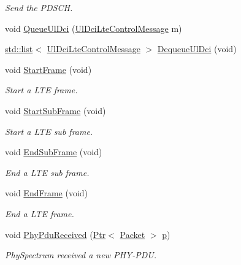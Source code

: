 \begin{DoxyCompactItemize}
\begin{DoxyCompactList}\small\item\em Send the P\+D\+S\+CH. \end{DoxyCompactList}\item 
void \hyperlink{classns3_1_1LteEnbPhy_a95bdedc1bcc58b79f4d1e26080cdf3f2}{Queue\+Ul\+Dci} (\hyperlink{classns3_1_1UlDciLteControlMessage}{Ul\+Dci\+Lte\+Control\+Message} m)
\item 
\hyperlink{openflow-interface_8h_afd9bcfa176617760671b67580f536fa7}{std\+::list}$<$ \hyperlink{classns3_1_1UlDciLteControlMessage}{Ul\+Dci\+Lte\+Control\+Message} $>$ \hyperlink{classns3_1_1LteEnbPhy_a6b0208f63caa33d708db8f457008b632}{Dequeue\+Ul\+Dci} (void)
\item 
void \hyperlink{classns3_1_1LteEnbPhy_a92d47dc2fa71c37ecb848fb9ed2ec592}{Start\+Frame} (void)
\begin{DoxyCompactList}\small\item\em Start a L\+TE frame. \end{DoxyCompactList}\item 
void \hyperlink{classns3_1_1LteEnbPhy_ab3594729c2fddcccdbae294b764dc83f}{Start\+Sub\+Frame} (void)
\begin{DoxyCompactList}\small\item\em Start a L\+TE sub frame. \end{DoxyCompactList}\item 
void \hyperlink{classns3_1_1LteEnbPhy_ac116fed9becb5dd146dc2c8b7fedfc58}{End\+Sub\+Frame} (void)
\begin{DoxyCompactList}\small\item\em End a L\+TE sub frame. \end{DoxyCompactList}\item 
void \hyperlink{classns3_1_1LteEnbPhy_ad28ae7c1f8faacc77bf5989c44409ac8}{End\+Frame} (void)
\begin{DoxyCompactList}\small\item\em End a L\+TE frame. \end{DoxyCompactList}\item 
void \hyperlink{classns3_1_1LteEnbPhy_a6f5e3a3285ccb75f962610bd43c0c436}{Phy\+Pdu\+Received} (\hyperlink{classns3_1_1Ptr}{Ptr}$<$ \hyperlink{classns3_1_1Packet}{Packet} $>$ \hyperlink{lte__link__budget__x2__handover__measures_8m_ac9de518908a968428863f829398a4e62}{p})
\begin{DoxyCompactList}\small\item\em Phy\+Spectrum received a new P\+H\+Y-\/\+P\+DU. \end{DoxyCompactList}\item 

\end{DoxyCompactItemize}
